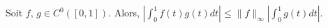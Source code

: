 Soit $f$, $g\in C^0([0,1])$. Alors, $\left|\int_0^1f(t)g(t)dt\right|\leq \|f\|_\infty \left|\int_0^1g(t)dt\right|$.

\begin{reponses}
\end{reponses}

